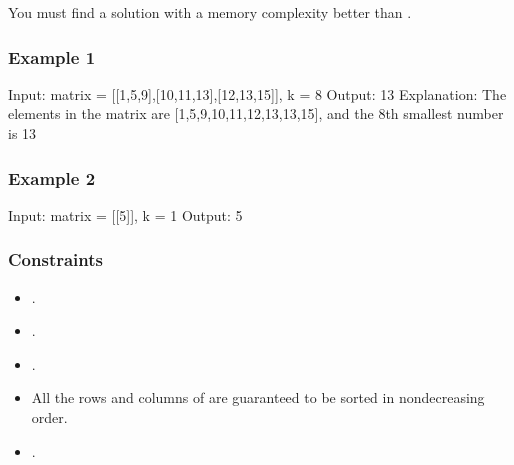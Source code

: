 \documentclass[letterpaper,12pt,english]{book}
\begin{document}
\sphinxAtStartPar
You must find a solution with a memory complexity better than .


\subsubsection{Example 1}
\label{\detokenize{Priority_Queue/378_Kth_Smallest_Element_in_a_Sorted_Matrix:example-1}}
\begin{sphinxVerbatim}[commandchars=\\\{\}]
Input: matrix = [[1,5,9],[10,11,13],[12,13,15]], k = 8
Output: 13
Explanation: The elements in the matrix are [1,5,9,10,11,12,13,13,15], and the 8th smallest number is 13
\end{sphinxVerbatim}


\subsubsection{Example 2}
\label{\detokenize{Priority_Queue/378_Kth_Smallest_Element_in_a_Sorted_Matrix:example-2}}
\begin{sphinxVerbatim}[commandchars=\\\{\}]
Input: matrix = [[\PYGZhy{}5]], k = 1
Output: \PYGZhy{}5
\end{sphinxVerbatim}


\subsubsection{Constraints}
\label{\detokenize{Priority_Queue/378_Kth_Smallest_Element_in_a_Sorted_Matrix:constraints}}\begin{itemize}
\item {} 
\sphinxAtStartPar
{}.

\item {} 
\sphinxAtStartPar
{}.

\item {} 
\sphinxAtStartPar
{}.

\item {} 
\sphinxAtStartPar
All the rows and columns of  are guaranteed to be sorted in non\sphinxhyphen{}decreasing order.

\item {} 
\sphinxAtStartPar
{}.

\end{itemize}
\end{document}

